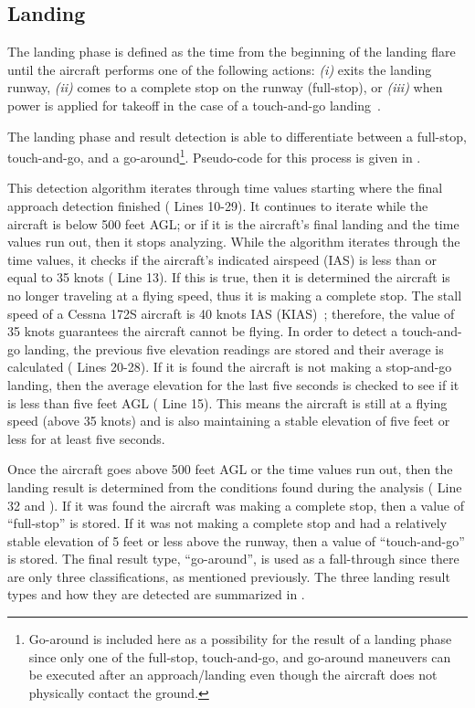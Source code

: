         
    
    \subsection{Landing}
    
    The landing phase is defined as the time from the beginning of the landing flare until the aircraft performs one of the following actions: \textit{(i)} exits the landing runway, \textit{(ii)} comes to a complete stop on the runway (full-stop), or \textit{(iii)} when power is applied for takeoff in the case of a touch-and-go landing~\cite{cictt2013phase}.
    
    The landing phase and result detection is able to differentiate between a full-stop, touch-and-go, and a go-around\footnote{Go-around is included here as a possibility for the result of a landing phase since only one of the full-stop, touch-and-go, and go-around maneuvers can be executed after an approach/landing even though the aircraft does not physically contact the ground.}.  Pseudo-code for this process is given in .
    
    This detection algorithm iterates through time values starting where the final approach detection finished ( Lines 10-29).  It continues to iterate while the aircraft is below 500 feet AGL; or if it is the aircraft's final landing and the time values run out, then it stops analyzing.  While the algorithm iterates through the time values, it checks if the aircraft's indicated airspeed (IAS) is less than or equal to 35 knots ( Line 13).  If this is true, then it is determined the aircraft is no longer traveling at a flying speed, thus it is making a complete stop.  The stall speed of a Cessna 172S aircraft is 40 knots IAS (KIAS)~\cite{und_poh}; therefore, the value of 35 knots guarantees the aircraft cannot be flying.  In order to detect a touch-and-go landing, the previous five elevation readings are stored and their average is calculated ( Lines 20-28).  If it is found the aircraft is not making a stop-and-go landing, then the average elevation for the last five seconds is checked to see if it is less than five feet AGL ( Line 15).  This means the aircraft is still at a flying speed (above 35 knots) and is also maintaining a stable elevation of five feet or less for at least five seconds.
    
    Once the aircraft goes above 500 feet AGL or the time values run out, then the landing result is determined from the conditions found during the analysis ( Line 32 and ).  If it was found the aircraft was making a complete stop, then a value of ``full-stop'' is stored.  If it was not making a complete stop and had a relatively stable elevation of 5 feet or less above the runway, then a value of ``touch-and-go'' is stored.  The final result type, ``go-around'', is used as a fall-through since there are only three classifications, as mentioned previously.  The three landing result types and how they are detected are summarized in .
    
